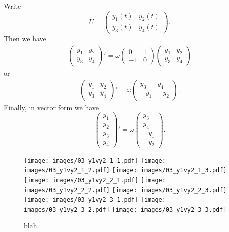 \begin{solution}
  Write 
  \[
    U = 
    \begin{pmatrix}
      y_1(t) & y_2(t) \\
      y_3(t) & y_4(t)
    \end{pmatrix}.
  \]
  Then we have 
  \begin{align*}
    \begin{pmatrix}
      y_1 & y_2 \\
      y_3 & y_4
    \end{pmatrix}' = 
    \omega
    \begin{pmatrix}
      0 & 1 \\
      -1 & 0
    \end{pmatrix}
    \begin{pmatrix}
      y_1 & y_2 \\
      y_3 & y_4
    \end{pmatrix}
  \end{align*}
  or 
  \begin{align*}
    \begin{pmatrix}
      y_1 & y_2 \\
      y_3 & y_4
    \end{pmatrix}' = 
    \omega
    \begin{pmatrix}
      y_3 & y_4 \\
      - y_1 & - y_2 
    \end{pmatrix}.
  \end{align*}
  Finally, in vector form we have
  \[
    \begin{pmatrix}
      y_1 \\ y_2 \\ y_3 \\ y_4
    \end{pmatrix}' = 
    \omega
    \begin{pmatrix}
      y_3 \\ y_4 \\ - y_1 \\ - y_2
    \end{pmatrix}.
  \]
  
  \begin{figure}
    \centering
    \texttt{[image: images/03\_y1vy2\_1\_1.pdf]}
    \texttt{[image: images/03\_y1vy2\_1\_2.pdf]}
    \texttt{[image: images/03\_y1vy2\_1\_3.pdf]}
    \texttt{[image: images/03\_y1vy2\_2\_1.pdf]}
    \texttt{[image: images/03\_y1vy2\_2\_2.pdf]}
    \texttt{[image: images/03\_y1vy2\_2\_3.pdf]}
    \texttt{[image: images/03\_y1vy2\_3\_1.pdf]}
    \texttt{[image: images/03\_y1vy2\_3\_2.pdf]}
    \texttt{[image: images/03\_y1vy2\_3\_3.pdf]}
    \caption{blah}
    \label{F:circles}
  \end{figure}
  
\end{solution}
